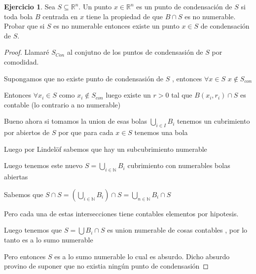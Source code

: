 \documentclass[12pt]{article}
\newcommand{\R}{\mathbb{R}}
\newcommand{\N}{\mathbb{N}}
\theoremstyle{definition}
\newtheorem{ej}{Ejercicio}
\begin{document}
\begin{ej}
  Sea $S \subseteq \R^n.$ Un punto $x \in \R^n$ es un punto de condensación de $S$ si toda bola $B$ centrada en $x$ tiene la propiedad de que $B \cap S$ es no numerable. Probar que si $S$ es no numerable entonces existe un punto $x \in S$ de condensación de $S$.

\begin{proof}
  Llamaré $S_{Con}$ al conjutno de los puntos de condensasión de $S$ por comodidad.

  Supongamos que no existe punto de condensasión de $S$ , entonces $\forall x \in S$ $x \notin S_{con}$ 
  
  Entonces $\forall x_{i} \in S$ como $x_{i} \notin S_{con}$ luego existe un $r>0$ tal que $B(x_{i},r_{i}) \cap S$ es contable (lo contrario a no numerable)

  Bueno ahora si tomamos la union de esas bolas $\bigcup_{i \in I} B_{i}$ tenemos un cubrimiento por abiertos de $S$ por que para cada $x \in S$ tenemos una bola

  Luego por Lindelöf sabemos que hay un subcubrimiento numerable 

  Luego tenemos este nuevo $S= \bigcup_{i \in \N} B_{i}$ cubrimiento con numerables bolas abiertas

  Sabemos que $S \cap S = (\bigcup_{i \in \N} B_{i}) \cap S = \bigcup_{n \in \N} B_{i} \cap S$

  Pero cada una de estas intersecciones tiene contables elementos por hipotesis. 

  Luego tenemos que $S = \bigcup B_{i} \cap S$ es union numerable de cosas contables , por lo tanto es a lo sumo numerable

  Pero entonces $S$ es a lo sumo numerable lo cual es absurdo. Dicho absurdo provino de suponer que no existia ningún punto de condensasión
\end{proof}
\end{ej}
\end{document}
